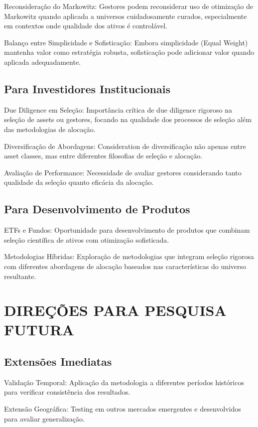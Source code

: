 Reconsideração do Markowitz: Gestores podem reconsiderar uso de otimização de Markowitz quando aplicada a universos cuidadosamente curados, especialmente em contextos onde qualidade dos ativos é controlável.

Balanço entre Simplicidade e Sofisticação: Embora simplicidade (Equal Weight) mantenha valor como estratégia robusta, sofisticação pode adicionar valor quando aplicada adequadamente.

\subsection{Para Investidores Institucionais}

Due Diligence em Seleção: Importância crítica de due diligence rigoroso na seleção de assets ou gestores, focando na qualidade dos processos de seleção além das metodologias de alocação.

Diversificação de Abordagens: Consideration de diversificação não apenas entre asset classes, mas entre diferentes filosofias de seleção e alocação.

Avaliação de Performance: Necessidade de avaliar gestores considerando tanto qualidade da seleção quanto eficácia da alocação.

\subsection{Para Desenvolvimento de Produtos}

ETFs e Fundos: Oportunidade para desenvolvimento de produtos que combinam seleção científica de ativos com otimização sofisticada.

Metodologias Híbridas: Exploração de metodologias que integram seleção rigorosa com diferentes abordagens de alocação baseados nas características do universo resultante.

\section{DIREÇÕES PARA PESQUISA FUTURA}

\subsection{Extensões Imediatas}

Validação Temporal: Aplicação da metodologia a diferentes períodos históricos para verificar consistência dos resultados.

Extensão Geográfica: Testing em outros mercados emergentes e desenvolvidos para avaliar generalização.

